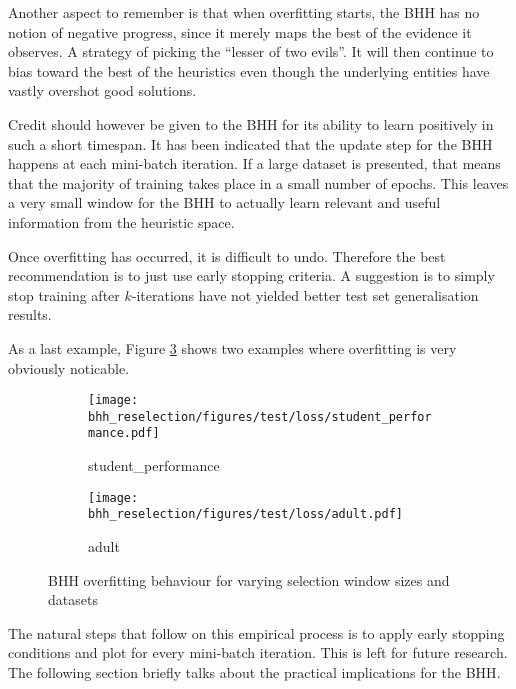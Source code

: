Another aspect to remember is that when overfitting starts, the \Ac{BHH} has no notion of negative progress, since it merely maps the best of the evidence it observes. A strategy of picking the ``lesser of two evils''. It will then continue to bias toward the best of the heuristics even though the underlying entities have vastly overshot good solutions.

Credit should however be given to the \Ac{BHH} for its ability to learn positively in such a short timespan. It has been indicated that the update step for the \Ac{BHH} happens at each mini-batch iteration. If a large dataset is presented, that means that the majority of training takes place in a small number of epochs. This leaves a very small window for the \Ac{BHH} to actually learn relevant and useful information from the heuristic space.

Once overfitting has occurred, it is difficult to undo. Therefore the best recommendation is to just use early stopping criteria. A suggestion is to simply stop training after $k$-iterations have not yielded better test set generalisation results.

As a last example, Figure \ref{fig:results:overfitting:figures:loss} shows two examples where overfitting is very obviously noticable.

\begin{figure}[htbp]
      \begin{subfigure}{0.5\textwidth}
            \centering
            \texttt{[image: bhh\_reselection/figures/test/loss/student\_performance.pdf]}
            \caption{student\_performance}
            \label{fig:results:overfitting:figures:loss1}
      \end{subfigure}
      \begin{subfigure}{0.5\textwidth}
            \centering
            \texttt{[image: bhh\_reselection/figures/test/loss/adult.pdf]}
            \caption{adult}
            \label{fig:results:overfitting:figures:loss2}
      \end{subfigure}
      \caption{\Acs{BHH} overfitting behaviour for varying selection window sizes and datasets}
      \label{fig:results:overfitting:figures:loss}
\end{figure}

The natural steps that follow on this empirical process is to apply early stopping conditions and plot for every mini-batch iteration. This is left for future research. The following section briefly talks about the practical implications for the \Ac{BHH}.


